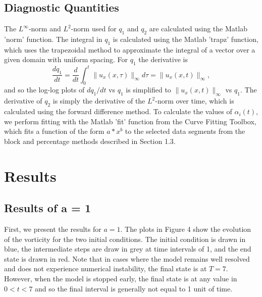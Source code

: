 \documentclass[12pt]{article}
\def\ux{u_x}
\numberwithin{equation}{section}
\begin{document}
\subsection{Diagnostic Quantities}

The $L^\infty$-norm and $L^2$-norm used for $q_1$ and $q_2$ are calculated using the Matlab 'norm' function. The integral in $q_1$ is calculated using the Matlab 'trapz' function, which uses the trapezoidal method to approximate the integral of a vector over a given domain with uniform spacing. For $q_1$ the derivative is 
\begin{equation}
\frac{dq_1}{dt} = \frac{d}{dt}\int_0^t \|\ux(x,\tau)\|_{\infty} d\tau = \|\ux(x,t)\|_{\infty},
\end{equation}
\noindent
and so the log-log plots of $dq_1/dt$ vs $q_1$ is simplified to $\|\ux(x,t)\|_{\infty}$ vs $q_1$. The derivative of $q_2$ is simply the derivative of the $L^2$-norm over time, which is calculated using the forward difference method. To calculate the values of $\alpha_i(t)$, we perform fitting with the Matlab 'fit' function from the Curve Fitting Toolbox, which fits a function of the form $a*x^b$ to the selected data segments from the block and percentage methods described in Section 1.3.

\section{Results}

\subsection{Results of $\boldsymbol a$ = 1}

First, we present the results for $a=1$. The plots in Figure 4 show the evolution of the vorticity for the two initial conditions. The initial condition is drawn in blue, the intermediate steps are draw in grey at time intervals of 1, and the end state is drawn in red. Note that in cases where the model remains well resolved and does not experience numerical instability, the final state is at $T=7$. However, when the model is stopped early, the final state is at any value in $0 < t < 7$ and so the final interval is generally not equal to 1 unit of time. 
\end{document}
